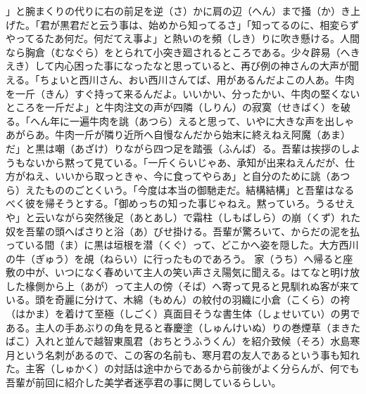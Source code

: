 \documentclass{book}
\begin{document}
」と腕まくりの代りに右の前足を逆（さ）かに肩の辺（へん）まで掻（か）き上げた。「君が黒君だと云う事は、始めから知ってるさ」「知ってるのに、相変らずやってるたあ何だ。何だてえ事よ」と熱いのを頻（しき）りに吹き懸ける。人間なら胸倉（むなぐら）をとられて小突き廻されるところである。少々辟易（へきえき）して内心困った事になったなと思っていると、再び例の神さんの大声が聞える。「ちょいと西川さん、おい西川さんてば、用があるんだよこの人あ。牛肉を一斤（きん）すぐ持って来るんだよ。いいかい、分ったかい、牛肉の堅くないところを一斤だよ」と牛肉注文の声が四隣（しりん）の寂寞（せきばく）を破る。「へん年に一遍牛肉を誂（あつら）えると思って、いやに大きな声を出しゃあがらあ。牛肉一斤が隣り近所へ自慢なんだから始末に終えねえ阿魔（あま）だ」と黒は嘲（あざけ）りながら四つ足を踏張（ふんば）る。吾輩は挨拶のしようもないから黙って見ている。「一斤くらいじゃあ、承知が出来ねえんだが、仕方がねえ、いいから取っときゃ、今に食ってやらあ」と自分のために誂（あつら）えたもののごとくいう。「今度は本当の御馳走だ。結構結構」と吾輩はなるべく彼を帰そうとする。「御めっちの知った事じゃねえ。黙っていろ。うるせえや」と云いながら突然後足（あとあし）で霜柱（しもばしら）の崩（くず）れた奴を吾輩の頭へばさりと浴（あ）びせ掛ける。吾輩が驚ろいて、からだの泥を払っている間（ま）に黒は垣根を潜（くぐ）って、どこかへ姿を隠した。大方西川の牛（ぎゅう）を覘（ねらい）に行ったものであろう。
家（うち）へ帰ると座敷の中が、いつになく春めいて主人の笑い声さえ陽気に聞える。はてなと明け放した椽側から上（あが）って主人の傍（そば）へ寄って見ると見馴れぬ客が来ている。頭を奇麗に分けて、木綿（もめん）の紋付の羽織に小倉（こくら）の袴（はかま）を着けて至極（しごく）真面目そうな書生体（しょせいてい）の男である。主人の手あぶりの角を見ると春慶塗（しゅんけいぬ）りの巻煙草（まきたばこ）入れと並んで越智東風君（おちとうふうくん）を紹介致候（そろ）水島寒月という名刺があるので、この客の名前も、寒月君の友人であるという事も知れた。主客（しゅかく）の対話は途中からであるから前後がよく分らんが、何でも吾輩が前回に紹介した美学者迷亭君の事に関しているらしい。
\end{document}

